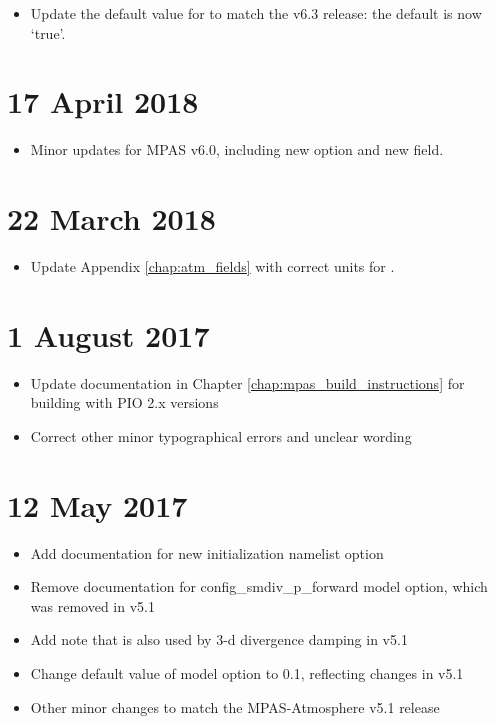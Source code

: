 \begin{itemize}
\item Update the default value for  to match the v6.3 release: the default is now `true'.
\end{itemize}

\section*{17 April 2018}

\begin{itemize}
\item Minor updates for MPAS v6.0, including new  option and new  field.
\end{itemize}

\section*{22 March 2018}

\begin{itemize}
\item Update Appendix \ref{chap:atm_fields} with correct units for .
\end{itemize}

\section*{1 August 2017}

\begin{itemize}
\item Update documentation in Chapter \ref{chap:mpas_build_instructions} for building with PIO 2.x versions
\item Correct other minor typographical errors and unclear wording
\end{itemize}

\section*{12 May 2017}

\begin{itemize}
\item Add documentation for new  initialization namelist option
\item Remove documentation for config\_smdiv\_p\_forward model option, which was removed in v5.1
\item Add note that  is also used by 3-d divergence damping in v5.1
\item Change default value of  model option to 0.1, reflecting changes in v5.1
\item Other minor changes to match the MPAS-Atmosphere v5.1 release
\end{itemize}

